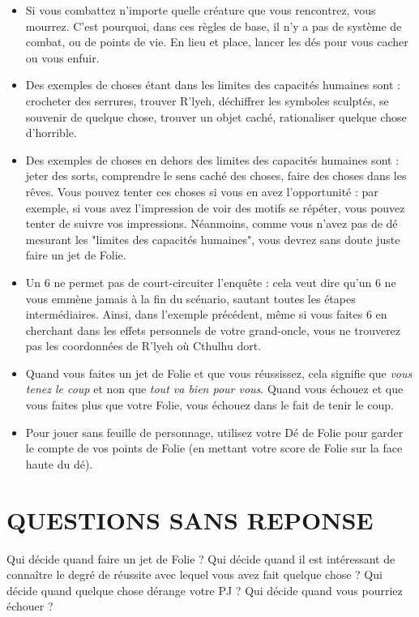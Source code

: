 \documentclass[11pt]{article}
\begin{document}
\begin{itemize}
\item Si vous combattez n'importe quelle créature que vous rencontrez, vous mourrez. C'est pourquoi, dans ces règles de base, il n'y a pas de système de combat, ou de points de vie. En lieu et place, lancer les dés pour vous cacher ou vous enfuir.\\
\item Des exemples de choses étant dans les limites des capacités humaines sont : crocheter des serrures, trouver R'lyeh, déchiffrer les symboles sculptés, se souvenir de quelque chose, trouver un objet caché, rationaliser quelque chose d'horrible.\\
\item Des exemples de choses en dehors des limites des capacités humaines sont : jeter des sorts, comprendre le sens caché des choses, faire des choses dans les rêves. Vous pouvez tenter ces choses si vous en avez l'opportunité : par exemple, si vous avez l'impression de voir des motifs se répéter, vous pouvez tenter de suivre vos impressions. Néanmoins, comme vous n'avez pas de dé mesurant les "limites des capacités humaines", vous devrez sans doute juste faire un jet de Folie.\\
\item Un 6 ne permet pas de court-circuiter l'enquête : cela veut dire qu'un 6 ne vous emmène jamais à la fin du scénario, sautant toutes les étapes intermédiaires. Ainsi, dans l'exemple précédent, même si vous faites 6 en cherchant dans les effets personnels de votre grand-oncle, vous ne trouverez pas les coordonnées de R'lyeh où Cthulhu dort.\\
\item Quand vous faites un jet de Folie et que vous réussissez, cela signifie que \textit{vous tenez le coup} et non que \textit{tout va bien pour vous}. Quand vous échouez et que vous faites plus que votre Folie, vous échouez dans le fait de tenir le coup.\\
\item Pour jouer sans feuille de personnage, utilisez votre Dé de Folie pour garder le compte de vos points de Folie (en mettant votre score de Folie sur la face haute du dé).
\end{itemize}

\section{QUESTIONS SANS REPONSE}

Qui décide quand faire un jet de Folie ? Qui décide quand il est intéressant de connaître le degré de réussite avec lequel vous avez fait quelque chose ? Qui décide quand quelque chose dérange votre PJ ? Qui décide quand vous pourriez échouer ?
\end{document}
